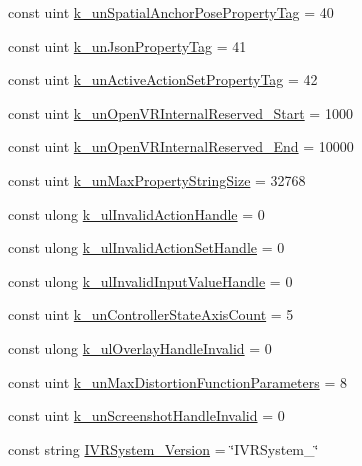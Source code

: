 \begin{DoxyCompactItemize}
\item 
const uint \mbox{\hyperlink{class_valve_1_1_v_r_1_1_open_v_r_a20245232bdd30b87f36a59713a789e6f}{k\+\_\+un\+Spatial\+Anchor\+Pose\+Property\+Tag}} = 40
\item 
const uint \mbox{\hyperlink{class_valve_1_1_v_r_1_1_open_v_r_a08ca9066783ee9137a554abe69b56379}{k\+\_\+un\+Json\+Property\+Tag}} = 41
\item 
const uint \mbox{\hyperlink{class_valve_1_1_v_r_1_1_open_v_r_a9112498c973b7c8f79e8b5f5d93a4e29}{k\+\_\+un\+Active\+Action\+Set\+Property\+Tag}} = 42
\item 
const uint \mbox{\hyperlink{class_valve_1_1_v_r_1_1_open_v_r_ae8cc988fffd79e0284f4abd602eb8ad2}{k\+\_\+un\+Open\+V\+R\+Internal\+Reserved\+\_\+\+Start}} = 1000
\item 
const uint \mbox{\hyperlink{class_valve_1_1_v_r_1_1_open_v_r_aa94f440fffc102ac92ff1154d896e41f}{k\+\_\+un\+Open\+V\+R\+Internal\+Reserved\+\_\+\+End}} = 10000
\item 
const uint \mbox{\hyperlink{class_valve_1_1_v_r_1_1_open_v_r_ab51e13d570a0e8a7fdd235d5abc8894b}{k\+\_\+un\+Max\+Property\+String\+Size}} = 32768
\item 
const ulong \mbox{\hyperlink{class_valve_1_1_v_r_1_1_open_v_r_a54205027e20886f1c166b2596a2c9547}{k\+\_\+ul\+Invalid\+Action\+Handle}} = 0
\item 
const ulong \mbox{\hyperlink{class_valve_1_1_v_r_1_1_open_v_r_a1fc9bba330b86c5e5cf851494fd0dd1c}{k\+\_\+ul\+Invalid\+Action\+Set\+Handle}} = 0
\item 
const ulong \mbox{\hyperlink{class_valve_1_1_v_r_1_1_open_v_r_a67e8312c5f769f85e8b7265518aceb45}{k\+\_\+ul\+Invalid\+Input\+Value\+Handle}} = 0
\item 
const uint \mbox{\hyperlink{class_valve_1_1_v_r_1_1_open_v_r_a55f715dda7e2b6d8b4a71d4643f63c94}{k\+\_\+un\+Controller\+State\+Axis\+Count}} = 5
\item 
const ulong \mbox{\hyperlink{class_valve_1_1_v_r_1_1_open_v_r_ad9be268d73a128738178fd468dc8cfe1}{k\+\_\+ul\+Overlay\+Handle\+Invalid}} = 0
\item 
const uint \mbox{\hyperlink{class_valve_1_1_v_r_1_1_open_v_r_a3ba9a6a80f8380de5b171c83d0eea169}{k\+\_\+un\+Max\+Distortion\+Function\+Parameters}} = 8
\item 
const uint \mbox{\hyperlink{class_valve_1_1_v_r_1_1_open_v_r_a70fbb4d6abe8b8487fc65b4aa0cbb5c8}{k\+\_\+un\+Screenshot\+Handle\+Invalid}} = 0
\item 
const string \mbox{\hyperlink{class_valve_1_1_v_r_1_1_open_v_r_a6b3cb66388dc19fc86b983d15bb50e4c}{I\+V\+R\+System\+\_\+\+Version}} = \char`\"{}I\+V\+R\+System\+\_\char`\"{}

\end{DoxyCompactItemize}
